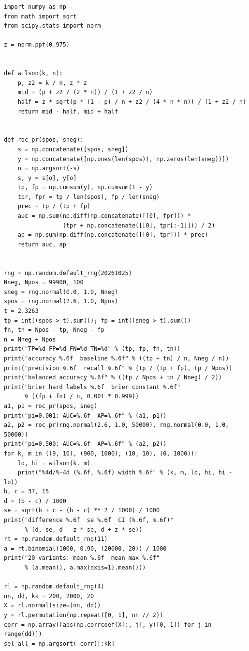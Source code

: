 \begin{lab}
\begin{verbatim}
import numpy as np
from math import sqrt
from scipy.stats import norm

z = norm.ppf(0.975)


def wilson(k, n):
    p, z2 = k / n, z * z
    mid = (p + z2 / (2 * n)) / (1 + z2 / n)
    half = z * sqrt(p * (1 - p) / n + z2 / (4 * n * n)) / (1 + z2 / n)
    return mid - half, mid + half


def roc_pr(spos, sneg):
    s = np.concatenate([spos, sneg])
    y = np.concatenate([np.ones(len(spos)), np.zeros(len(sneg))])
    o = np.argsort(-s)
    s, y = s[o], y[o]
    tp, fp = np.cumsum(y), np.cumsum(1 - y)
    tpr, fpr = tp / len(spos), fp / len(sneg)
    prec = tp / (tp + fp)
    auc = np.sum(np.diff(np.concatenate([[0], fpr])) *
                 (tpr + np.concatenate([[0], tpr[:-1]])) / 2)
    ap = np.sum(np.diff(np.concatenate([[0], tpr])) * prec)
    return auc, ap


rng = np.random.default_rng(20261025)
Nneg, Npos = 99900, 100
sneg = rng.normal(0.0, 1.0, Nneg)
spos = rng.normal(2.6, 1.0, Npos)
t = 2.3263
tp = int((spos > t).sum()); fp = int((sneg > t).sum())
fn, tn = Npos - tp, Nneg - fp
n = Nneg + Npos
print("TP=%d FP=%d FN=%d TN=%d" % (tp, fp, fn, tn))
print("accuracy %.6f  baseline %.6f" % ((tp + tn) / n, Nneg / n))
print("precision %.6f  recall %.6f" % (tp / (tp + fp), tp / Npos))
print("balanced accuracy %.6f" % ((tp / Npos + tn / Nneg) / 2))
print("brier hard labels %.6f  brier constant %.6f"
      % ((fp + fn) / n, 0.001 * 0.999))
a1, p1 = roc_pr(spos, sneg)
print("pi=0.001: AUC=%.6f  AP=%.6f" % (a1, p1))
a2, p2 = roc_pr(rng.normal(2.6, 1.0, 50000), rng.normal(0.0, 1.0, 50000))
print("pi=0.500: AUC=%.6f  AP=%.6f" % (a2, p2))
for k, m in ((9, 10), (900, 1000), (10, 10), (0, 1000)):
    lo, hi = wilson(k, m)
    print("%4d/%-4d (%.6f, %.6f) width %.6f" % (k, m, lo, hi, hi - lo))
b, c = 37, 15
d = (b - c) / 1000
se = sqrt(b + c - (b - c) ** 2 / 1000) / 1000
print("difference %.6f  se %.6f  CI (%.6f, %.6f)"
      % (d, se, d - z * se, d + z * se))
rt = np.random.default_rng(11)
a = rt.binomial(1000, 0.90, (20000, 20)) / 1000
print("20 variants: mean %.6f  mean max %.6f"
      % (a.mean(), a.max(axis=1).mean()))

rl = np.random.default_rng(4)
nn, dd, kk = 200, 2000, 20
X = rl.normal(size=(nn, dd))
y = rl.permutation(np.repeat([0, 1], nn // 2))
corr = np.array([abs(np.corrcoef(X[:, j], y)[0, 1]) for j in range(dd)])
sel_all = np.argsort(-corr)[:kk]



\end{verbatim}
\end{lab}
